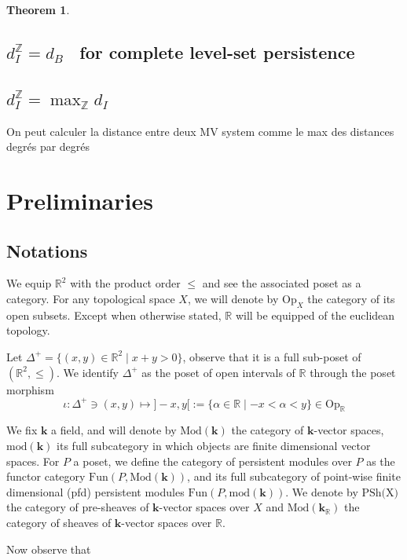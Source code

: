 \documentclass[a4paper, english, 11pt]{article}
\newcommand{\kk}[0]{\textbf{k}}
\newcommand{\Mod}[0]{\text{Mod}}
\newcommand{\0}{\vec{0}}
\newcommand{\R}[0]{\mathbb{R}}
\newcommand{\Z}[0]{\mathbb{Z}}
\newcommand{\Op}[0]{\text{Op}}
\newtheorem{thm}[prop]{Theorem}
\begin{document}
\begin{thm}

\end{thm}


\subsection{\og $d_I^\Z = d_B$ \fg ~for complete level-set persistence}

\subsection{\og $d_I^\Z = \max_\Z d_I$\fg~}
On peut calculer la distance entre deux MV system comme le max des distances degrés par degrés




\section{Preliminaries}

\subsection{Notations}

We equip $\R^2$ with the product order $\leq$ and see the associated poset as a category. For any topological space $X$, we will denote by $\Op_X$ the category of its open subsets. Except when otherwise stated, $\R$ will be equipped of the euclidean topology. 

Let $\Delta^+ = \{(x,y)\in \R^2 \mid  x + y > 0 \}$, observe that it is a full sub-poset of $(\R^2,\leq)$. We identify $\Delta^+$ as the poset of open intervals of $\R$ through the poset morphism $$\iota : \Delta^+ \ni (x,y) \mapsto ]-x,y[ := \{\alpha \in \R \mid -x < \alpha < y\} \in \Op_\R $$

We fix $\kk$ a field, and will denote by $\Mod (\kk)$ the category of $\kk$-vector spaces, $\text{mod}(\kk)$ its full subcategory in which objects are finite dimensional vector spaces. For $P$ a poset, we define the category of persistent modules over $P$ as the functor category $\text{Fun}(P,\Mod(\kk))$, and its full subcategory of point-wise finite dimensional (pfd) persistent modules $\text{Fun}(P,\text{mod}(\kk))$. We denote by $\text{PSh(X)}$ the category of pre-sheaves of $\kk$-vector spaces over $X$ and $\Mod(\kk_\R)$ the category of sheaves of $\kk$-vector spaces over $\R$.  

Now observe that 
\end{document}
